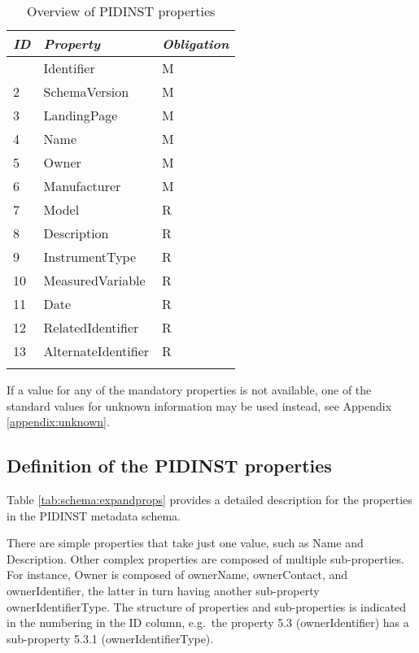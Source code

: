 \documentclass[titlepage=true,twoside=false,DIV=13]{scrartcl}
\begin{document}
\begin{longtable}{|l|l|l|}
  \hline
  \emph{ID} & \emph{Property} & \emph{Obligation} \\
  \hline \endhead
  \hline \endfoot\endlastfoot
  1     & Identifier          & M \\
  2     & SchemaVersion       & M \\
  3     & LandingPage         & M \\
  4     & Name                & M \\
  5     & Owner               & M \\
  6     & Manufacturer        & M \\
  7     & Model               & R \\
  8     & Description         & R \\
  9     & InstrumentType      & R \\
  10    & MeasuredVariable    & R \\
  11    & Date                & R \\
  12    & RelatedIdentifier   & R \\
  13    & AlternateIdentifier & R \\
  \hline
  \caption{Overview of PIDINST properties}
  \label{tab:schema:propoverview}
\end{longtable}

If a value for any of the mandatory properties is not available, one
of the standard values for unknown information may be used instead,
see Appendix \ref{appendix:unknown}.

\subsection{Definition of the PIDINST properties}

Table \ref{tab:schema:expandprops} provides a detailed description for
the properties in the PIDINST metadata schema.

There are simple properties that take just one value, such as Name and
Description.  Other complex properties are composed of multiple
sub-properties.  For instance, Owner is composed of ownerName,
ownerContact, and ownerIdentifier, the latter in turn having another
sub-property ownerIdentifierType.  The structure of properties and
sub-properties is indicated in the numbering in the ID column,
e.g.\ the property 5.3 (ownerIdentifier) has a sub-property 5.3.1
(ownerIdentifierType).
\end{document}
